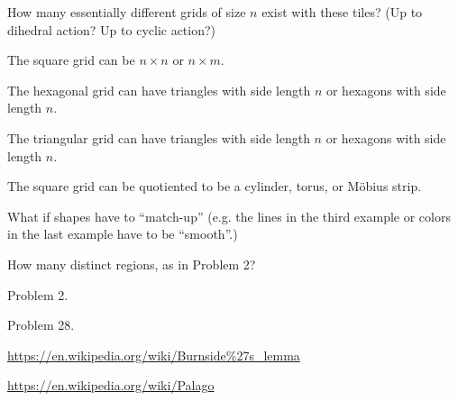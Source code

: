 \documentclass{article}
\begin{document}
\begin{question}
  How many essentially different grids of size $n$ exist with these tiles?
  (Up to dihedral action? Up to cyclic action?)
\end{question}
\begin{related}
  \item The square grid can be $n \times n$ or $n \times m$.
  \item The hexagonal grid can have triangles with side length $n$ or hexagons with side length $n$.
  \item The triangular grid can have triangles with side length $n$ or hexagons with side length $n$.
  \item The square grid can be quotiented to be a cylinder, torus, or M\"obius strip.
  \item What if shapes have to ``match-up'' (e.g. the lines in the third example
    or colors in the last example have to be ``smooth''.)
  \item How many distinct regions, as in Problem 2?
\end{related}
\begin{references}
  \item Problem 2.
  \item Problem 28.
  \item \url{https://en.wikipedia.org/wiki/Burnside%27s_lemma}
  \item \url{https://en.wikipedia.org/wiki/Palago}
\end{references}
\end{document}

